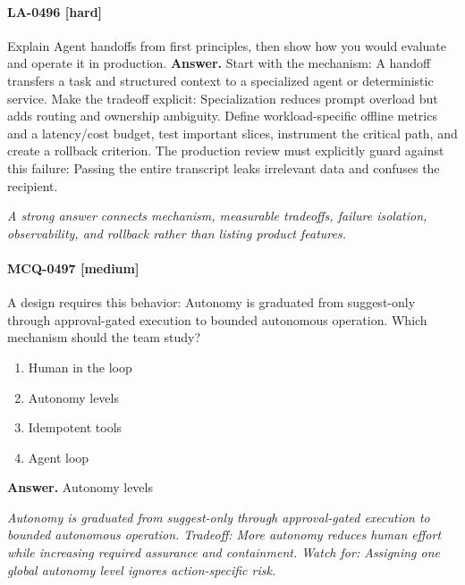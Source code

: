 \paragraph{LA-0496 [hard]} Explain Agent handoffs from first principles, then show how you would evaluate and operate it in production.
\noindent\textbf{Answer.} Start with the mechanism: A handoff transfers a task and structured context to a specialized agent or deterministic service. Make the tradeoff explicit: Specialization reduces prompt overload but adds routing and ownership ambiguity. Define workload-specific offline metrics and a latency/cost budget, test important slices, instrument the critical path, and create a rollback criterion. The production review must explicitly guard against this failure: Passing the entire transcript leaks irrelevant data and confuses the recipient.
\par\textit{A strong answer connects mechanism, measurable tradeoffs, failure isolation, observability, and rollback rather than listing product features.}
\paragraph{MCQ-0497 [medium]} A design requires this behavior: Autonomy is graduated from suggest-only through approval-gated execution to bounded autonomous operation. Which mechanism should the team study?
\begin{enumerate}[label=\Alph*.]
\item Human in the loop
\item Autonomy levels
\item Idempotent tools
\item Agent loop
\end{enumerate}
\noindent\textbf{Answer.} Autonomy levels
\par\textit{Autonomy is graduated from suggest-only through approval-gated execution to bounded autonomous operation. Tradeoff: More autonomy reduces human effort while increasing required assurance and containment. Watch for: Assigning one global autonomy level ignores action-specific risk.}
